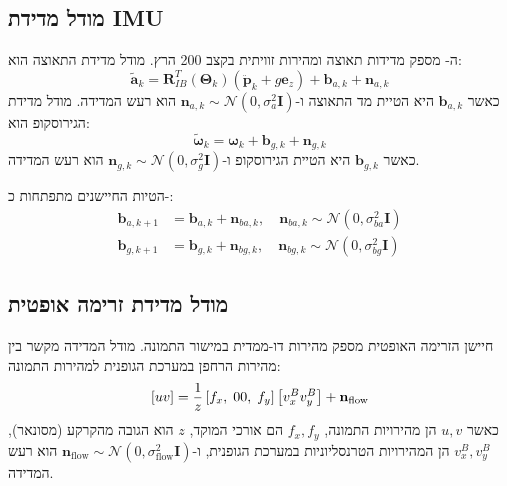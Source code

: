 \subsection{מודל מדידת IMU}
\label{sec:ch05_imu_model}

ה- מספק מדידות תאוצה ומהירות זוויתית בקצב 200 הרץ. מודל מדידת התאוצה הוא:
\begin{equation}
\tilde{\mathbf{a}}_k = \mathbf{R}_{IB}^T(\boldsymbol{\Theta}_k) \left( \ddot{\mathbf{p}}_k + g \mathbf{e}_z \right) + \mathbf{b}_{a,k} + \mathbf{n}_{a,k}
\label{eq:ch05_accel_model}
\end{equation}
כאשר $\mathbf{b}_{a,k}$ היא הטיית מד התאוצה ו-$\mathbf{n}_{a,k} \sim \mathcal{N}(0, \sigma_a^2 \mathbf{I})$ הוא רעש המדידה. מודל מדידת הגירוסקופ הוא:
\begin{equation}
\tilde{\boldsymbol{\omega}}_k = \boldsymbol{\omega}_k + \mathbf{b}_{g,k} + \mathbf{n}_{g,k}
\label{eq:ch05_gyro_model}
\end{equation}
כאשר $\mathbf{b}_{g,k}$ היא הטיית הגירוסקופ ו-$\mathbf{n}_{g,k} \sim \mathcal{N}(0, \sigma_g^2 \mathbf{I})$ הוא רעש המדידה.

הטיות החיישנים מתפתחות כ-:
\begin{align}
\mathbf{b}_{a,k+1} &= \mathbf{b}_{a,k} + \mathbf{n}_{ba,k}, \quad \mathbf{n}_{ba,k} \sim \mathcal{N}(0, \sigma_{ba}^2 \mathbf{I}) \\
\mathbf{b}_{g,k+1} &= \mathbf{b}_{g,k} + \mathbf{n}_{bg,k}, \quad \mathbf{n}_{bg,k} \sim \mathcal{N}(0, \sigma_{bg}^2 \mathbf{I})
\label{eq:ch05_bias_model}
\end{align}

\subsection{מודל מדידת זרימה אופטית}
\label{sec:ch05_optical_flow_model}

חיישן הזרימה האופטית מספק מהירות דו-ממדית במישור התמונה. מודל המדידה מקשר בין מהירות הרחפן במערכת הגופנית למהירות התמונה:
\begin{equation}
\left[u \\ v\right] = \frac{1}{z} \left[f_x,\; 0 \\ 0,\; f_y\right] \left[v_x^B \\ v_y^B\right] + \mathbf{n}_{\text{flow}}
\label{eq:ch05_flow_model}
\end{equation}
כאשר $u, v$ הן מהירויות התמונה, $f_x, f_y$ הם אורכי המוקד, $z$ הוא הגובה מהקרקע (מסונאר), $v_x^B, v_y^B$ הן המהירויות הטרנסליוניות במערכת הגופנית, ו-$\mathbf{n}_{\text{flow}} \sim \mathcal{N}(0, \sigma_{\text{flow}}^2 \mathbf{I})$ הוא רעש המדידה.

